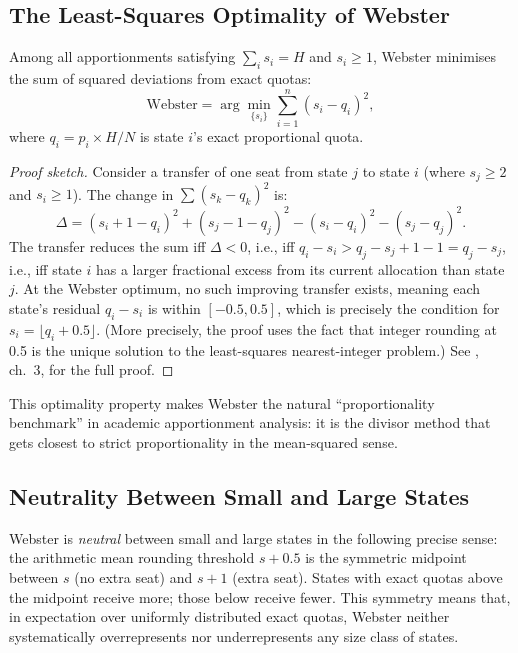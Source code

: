 \subsection{The Least-Squares Optimality of Webster}

\begin{theorem}
  Among all apportionments satisfying $\sum_i s_i = H$ and $s_i \geq 1$,
  Webster minimises the sum of squared deviations from exact quotas:
  \[
    \text{Webster} = \arg\min_{\{s_i\}} \sum_{i=1}^{n} (s_i - q_i)^2,
  \]
  where $q_i = p_i \times H / N$ is state $i$'s exact proportional quota.
\end{theorem}

\begin{proof}[Proof sketch]
  Consider a transfer of one seat from state $j$ to state $i$
  (where $s_j \geq 2$ and $s_i \geq 1$).
  The change in $\sum (s_k - q_k)^2$ is:
  \[
    \Delta = (s_i + 1 - q_i)^2 + (s_j - 1 - q_j)^2
           - (s_i - q_i)^2 - (s_j - q_j)^2.
  \]
  The transfer reduces the sum iff $\Delta < 0$, i.e.,
  iff $q_i - s_i > q_j - s_j + 1 - 1 = q_j - s_j$,
  i.e., iff state $i$ has a larger fractional excess from its
  current allocation than state $j$.
  At the Webster optimum, no such improving transfer exists,
  meaning each state's residual $q_i - s_i$ is within $[-0.5, 0.5]$,
  which is precisely the condition for $s_i = \lfloor q_i + 0.5 \rfloor$.
  (More precisely, the proof uses the fact that integer rounding at 0.5
  is the unique solution to the least-squares nearest-integer problem.)
  See \citet{balinski1982fair}, ch.~3, for the full proof.
\end{proof}

This optimality property makes Webster the natural ``proportionality
benchmark'' in academic apportionment analysis:
it is the divisor method that gets closest to strict proportionality
in the mean-squared sense.

\subsection{Neutrality Between Small and Large States}

Webster is \emph{neutral} between small and large states in the following
precise sense: the arithmetic mean rounding threshold $s + 0.5$ is the
symmetric midpoint between $s$ (no extra seat) and $s+1$ (extra seat).
States with exact quotas above the midpoint receive more; those below
receive fewer.
This symmetry means that, in expectation over uniformly distributed
exact quotas, Webster neither systematically overrepresents nor
underrepresents any size class of states.

